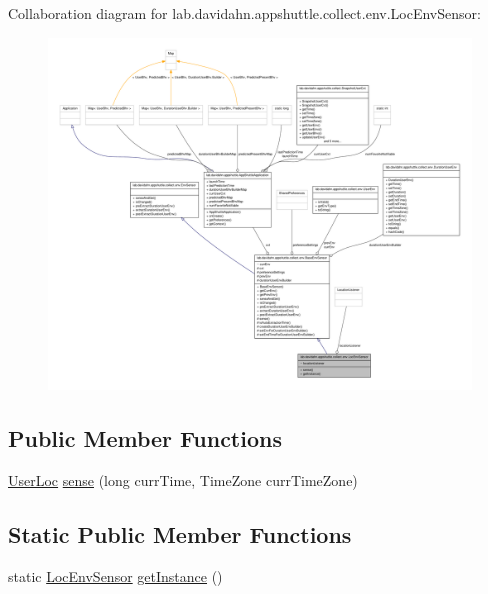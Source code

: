 \-Collaboration diagram for lab.\-davidahn.\-appshuttle.\-collect.\-env.\-Loc\-Env\-Sensor\-:
\nopagebreak
\begin{figure}[H]
\begin{center}
\leavevmode
\includegraphics[width=350pt]{classlab_1_1davidahn_1_1appshuttle_1_1collect_1_1env_1_1_loc_env_sensor__coll__graph}
\end{center}
\end{figure}
\subsection*{\-Public \-Member \-Functions}
\begin{DoxyCompactItemize}
\item 
\hyperlink{classlab_1_1davidahn_1_1appshuttle_1_1collect_1_1env_1_1_user_loc}{\-User\-Loc} \hyperlink{classlab_1_1davidahn_1_1appshuttle_1_1collect_1_1env_1_1_loc_env_sensor_a6ca7d81b8787dcbe578f3236bed81243}{sense} (long curr\-Time, \-Time\-Zone curr\-Time\-Zone)
\end{DoxyCompactItemize}
\subsection*{\-Static \-Public \-Member \-Functions}
\begin{DoxyCompactItemize}
\item 
static \hyperlink{classlab_1_1davidahn_1_1appshuttle_1_1collect_1_1env_1_1_loc_env_sensor}{\-Loc\-Env\-Sensor} \hyperlink{classlab_1_1davidahn_1_1appshuttle_1_1collect_1_1env_1_1_loc_env_sensor_adb621986348d8af2ac84acf77ebd9f5c}{get\-Instance} ()
\end{DoxyCompactItemize}
